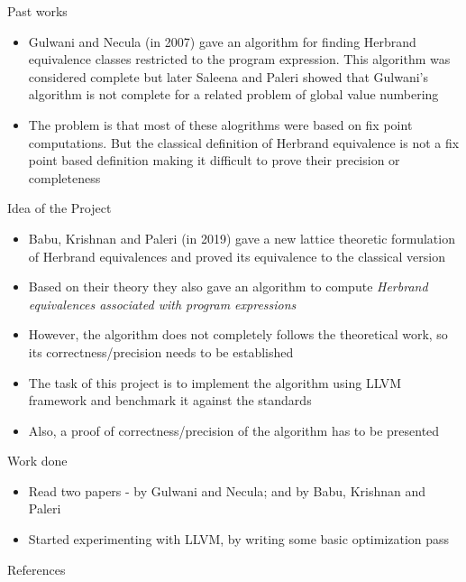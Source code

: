 \documentclass[11pt]{beamer}
\begin{document}
\begin{frame}{Past works}
    \begin{itemize}
        \item Gulwani and Necula (in 2007) gave an algorithm for finding Herbrand equivalence classes restricted to the program expression. This algorithm was considered complete but later Saleena and Paleri showed that Gulwani's algorithm is not complete for a related problem of global value numbering
        \item The problem is that most of these alogrithms were based on fix point computations. But the classical definition of Herbrand equivalence is not a fix point based definition making it difficult to prove their precision or completeness 
    \end{itemize}
\end{frame}

\begin{frame}{Idea of the Project}
    \begin{itemize}
        \item Babu, Krishnan and Paleri (in 2019) gave a new lattice theoretic formulation of Herbrand equivalences and proved its equivalence to the classical version
        \item Based on their theory they also gave an algorithm to compute \textit{Herbrand equivalences associated with program expressions}
        \item However, the algorithm does not completely follows the theoretical work, so its correctness/precision needs to be established
        \item The task of this project is to implement the algorithm using LLVM framework and benchmark it against the standards
        \item Also, a proof of correctness/precision of the algorithm has to be presented
    \end{itemize}
\end{frame}

\begin{frame}{Work done}
    \begin{itemize}
        \item Read two papers - by Gulwani and Necula\cite{Gulwani}; and by Babu, Krishnan and Paleri\cite{Babu} 
        \item Started experimenting with LLVM, by writing some basic optimization pass
    \end{itemize}
\end{frame}

\begin{frame}{References}


\end{frame}
\end{document}
